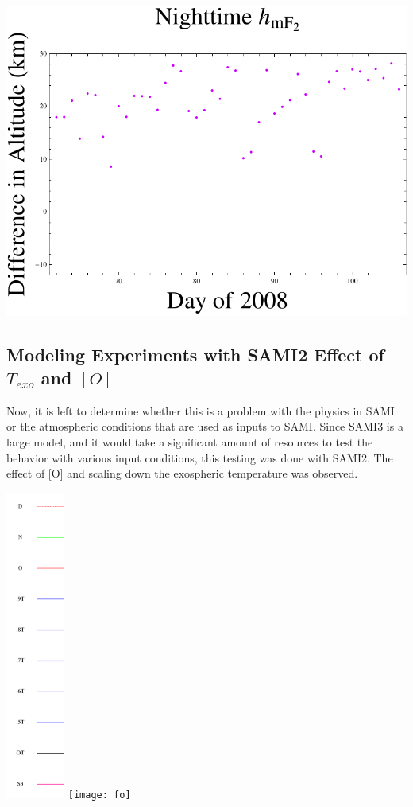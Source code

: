 \documentclass[12pt]{IEEEtran}
\begin{document}
  \includegraphics[width=.75\textwidth]{nighth}
    \clearpage

    \subsection{Modeling Experiments with SAMI2 {Effect of $T_{exo}$ and $\left[O\right]$}}
    Now, it is left to determine whether this is a problem with the physics in SAMI or the atmospheric conditions that are used as inputs to SAMI. Since SAMI3 is a large model, and it would take a significant amount of resources to test the behavior with various input conditions, this testing was done with SAMI2. The effect of [O] and scaling down the exospheric temperature was observed.

    \includegraphics[height=4in]{legend}
    \texttt{[image: fo]}
    \clearpage
\end{document}

